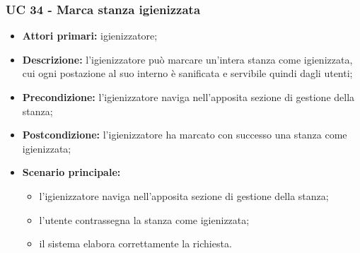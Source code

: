 \subsubsection{UC 34 - Marca stanza igienizzata}

\begin{itemize}
\item \textbf{Attori primari:} igienizzatore;
\item \textbf{Descrizione:} l’igienizzatore può marcare un'intera stanza come igienizzata, cui ogni postazione al suo interno è sanificata e servibile quindi dagli utenti;
\item \textbf{Precondizione:} l'igienizzatore naviga nell’apposita sezione di gestione della stanza; 
\item \textbf{Postcondizione:} l'igienizzatore ha marcato con successo una stanza come igienizzata;
\item \textbf{Scenario principale:} 
	\begin{itemize}
		\item l'igienizzatore naviga nell’apposita sezione di gestione della stanza;	
		\item l'utente contrassegna la stanza come igienizzata;
		\item il sistema elabora correttamente la richiesta.
		\end{itemize}
\end{itemize}


